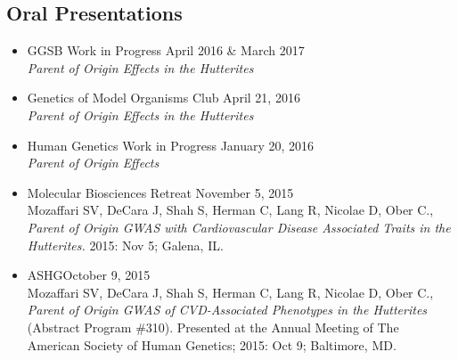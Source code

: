 \documentclass[a4paper, 11pt]{article}
\begin{document}
\subsection*{Oral Presentations}
\begin{itemize}
	\item GGSB Work in Progress \hfill April 2016 \& March 2017\\ \emph{Parent of Origin Effects in the Hutterites}
	\item Genetics of Model Organisms Club \hfill April 21, 2016\\  \emph{Parent of Origin Effects in the Hutterites}
  	\item Human Genetics Work in Progress \hfill January 20, 2016\\ \emph{Parent of Origin Effects} 
	\item Molecular Biosciences Retreat \hfill November 5, 2015\\ Mozaffari SV, DeCara J, Shah S, Herman C, Lang R, Nicolae D, Ober C., \emph{Parent of Origin GWAS with Cardiovascular Disease Associated Traits in the Hutterites.} 2015: Nov 5; Galena, IL.
    \item ASHG\hfill October 9, 2015\\ Mozaffari SV, DeCara J, Shah S, Herman C, Lang R, Nicolae D, Ober C., \emph{Parent of Origin GWAS of CVD-Associated Phenotypes in the Hutterites} (Abstract Program \#310). Presented at the Annual Meeting of The American Society of Human Genetics; 2015: Oct 9; Baltimore, MD. 
  

\end{itemize}
\end{document}
